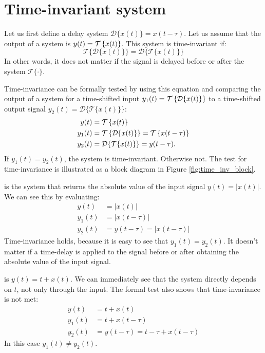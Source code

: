 \section{Time-invariant system}

Let us first define a delay system $\mathcal{D}\{x(t)\} = x(t-\tau)$. Let us assume that the output of a system is $y(t) = \spop[x(t)]$. This system is time-invariant if:
\begin{equation}
\boxed{
\mathcal{T}\{\mathcal{D}\{x(t)\}\} = \mathcal{D}\{\mathcal{T}\{x(t)\}\}
}
\end{equation}
In other words, it does not matter if the signal is delayed before or
after the system $\mathcal{T}\{\cdot\}$.

Time-invariance can be formally tested by using this equation and
comparing the output of a system for a time-shifted input $y_1(t) =
\spop[\mathcal{D}\{x(t)\}]$ to a time-shifted output signal $y_{2}(t)
= \mathcal{D}\{\mathcal{T}\{x(t)\}\}$:
\begin{align}
y(t) &= \spop[x(t)] \\
y_1(t) &= \spop[\mathcal{D}\{x(t)\}] = \spop[x(t-\tau)]\\
y_2(t) &= \mathcal{D}\{\mathcal{T}\{x(t)\}\} = y(t-\tau).
\end{align}
If $y_1(t) = y_2(t)$, the system is time-invariant. Otherwise not. The
test for time-invariance is illustrated as a block diagram in Figure
\ref{fig:time_inv_block}.

 is the system that
returns the absolute value of the input signal $y(t)=|x(t)|$. We can
see this by evaluating:
\begin{align}
y(t) &= |x(t)|\\
y_1(t) &= |x(t-\tau)|\\
y_2(t) &= y(t-\tau) = |x(t-\tau)|
\end{align}
Time-invariance holds, because it is easy to see that
$y_1(t)=y_2(t)$. It doesn't matter if a time-delay is applied to the
signal before or after obtaining the absolute value of the input signal.

 is $y(t)
= t + x(t)$. We can immediately see that the system directly depends
on $t$, not only through the input. The formal test also shows that
time-invariance is not met:
\begin{align}
y(t) &= t + x(t)\\
y_1(t) &= t + x(t-\tau)\\
y_2(t) &= y(t-\tau) = t - \tau + x(t-\tau)
\end{align}
In this case $y_1(t) \ne y_2(t)$.


